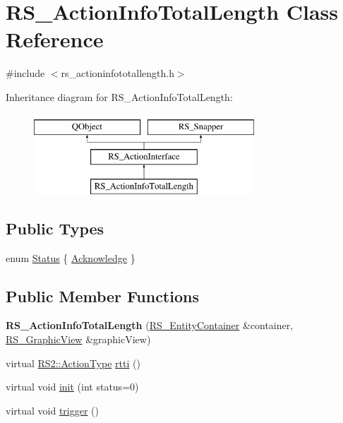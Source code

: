 \hypertarget{classRS__ActionInfoTotalLength}{\section{R\-S\-\_\-\-Action\-Info\-Total\-Length Class Reference}
\label{classRS__ActionInfoTotalLength}
}


{\ttfamily \#include $<$rs\-\_\-actioninfototallength.\-h$>$}

Inheritance diagram for R\-S\-\_\-\-Action\-Info\-Total\-Length\-:\begin{figure}[H]
\begin{center}
\leavevmode
\includegraphics[height=3.000000cm]{classRS__ActionInfoTotalLength}
\end{center}
\end{figure}
\subsection*{Public Types}
\begin{DoxyCompactItemize}
\item 
enum \hyperlink{classRS__ActionInfoTotalLength_aa34386c6cb3d850a1ab310ec4dcc1275}{Status} \{ \hyperlink{classRS__ActionInfoTotalLength_aa34386c6cb3d850a1ab310ec4dcc1275aaf3426e4de66fa5dba77f698044a6005}{Acknowledge}
 \}
\end{DoxyCompactItemize}
\subsection*{Public Member Functions}
\begin{DoxyCompactItemize}
\item 
\hypertarget{classRS__ActionInfoTotalLength_a3ce4d4cf5084b1d92ecc624b4811dd68}{{\bfseries R\-S\-\_\-\-Action\-Info\-Total\-Length} (\hyperlink{classRS__EntityContainer}{R\-S\-\_\-\-Entity\-Container} \&container, \hyperlink{classRS__GraphicView}{R\-S\-\_\-\-Graphic\-View} \&graphic\-View)}\label{classRS__ActionInfoTotalLength_a3ce4d4cf5084b1d92ecc624b4811dd68}

\item 
virtual \hyperlink{classRS2_afe3523e0bc41fd637b892321cfc4b9d7}{R\-S2\-::\-Action\-Type} \hyperlink{classRS__ActionInfoTotalLength_afb54c316492aa577ca1defec870a2a71}{rtti} ()
\item 
virtual void \hyperlink{classRS__ActionInfoTotalLength_a89d6255071929ae2bc93b93a4eb203de}{init} (int status=0)
\item 
virtual void \hyperlink{classRS__ActionInfoTotalLength_a3e439b32e37ed62c7a4a7244d3e157e8}{trigger} ()
\end{DoxyCompactItemize}

